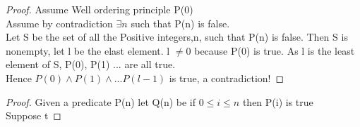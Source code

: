 \documentclass[12pt]{article}
\newenvironment{statement}[2][Section]{\begin{trivlist}
\item[\hskip \labelsep {\bfseries #1}\hskip \labelsep {\bfseries #2.}]}{\end{trivlist}}
\begin{document}
\begin{statement}{Well Ordering Principle implies Strong Induction}

  \begin{proof}
Assume Well ordering principle P(0)\\
Assume by contradiction  $\exists n $ such that P(n) is false.\\
Let S be the set of all the Positive integers,n, such that P(n) is false.
Then S is nonempty, let l be the elast element. l $\ne 0$ because P(0) is true. As l is the least element of S, P(0), P(1) ... are all true.\\
Hence $P(0) \land P(1) \land ... P(l - 1)$ is true, a contradiction!


  \end{proof}

\end{statement}

\begin{statement}{standard induction implies strong induction}
  \begin{proof}
    Given a predicate P(n) let Q(n) be if $0 \le i \le n$ then P(i) is true \\
    Suppose t





  \end{proof}
\end{statement}


 
\end{document}
